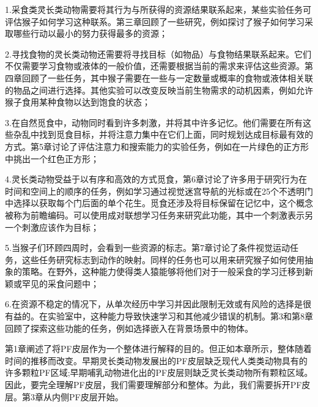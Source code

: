 1.采食类灵长类动物需要将其行为与所获得的资源结果联系起来，某些实验任务可评估猴子如何学习这种联系。第三章回顾了一些研究，例如探讨了猴子如何学习采取哪些行动以最小的努力获得最多的资源；\par
2.寻找食物的灵长类动物还需要将寻找目标（如物品）与食物结果联系起来。它们不仅需要学习食物或液体的一般价值，还需要根据当前的需求来评估这些资源。第四章回顾了一些任务，其中猴子需要在一些与一定数量或概率的食物或液体相关联的物品之间进行选择。其他实验可以改变反映当前生物需求的动机因素，例如允许猴子食用某种食物以达到饱食的状态；\par
3.在自然觅食中，动物同时看到许多刺激，并将其中许多记忆。他们需要在所有这些杂乱中找到觅食目标，并将注意力集中在它们上面，同时规划达成目标最有效的方式。第5章讨论了评估注意力和搜索能力的实验任务，例如在一片绿色的正方形中挑出一个红色正方形；\par
4.灵长类动物受益于以有序和高效的方式觅食，第6章讨论了许多用于研究行为在时间和空间上的顺序的任务，例如学习通过视觉迷宫导航的光标或在25个不透明门中选择以获取每个门后面的单个花生。觅食还涉及将目标保留在记忆中，这个概念被称为前瞻编码。可以使用成对联想学习任务来研究此功能，其中一个刺激表示另一个刺激应该作为目标；\par
5.当猴子们环顾四周时，会看到一些资源的标志。第7章讨论了条件视觉运动任务，这些任务研究标志到动作的映射。同样的任务也可以用来研究猴子如何使用抽象的策略。在野外，这种能力使得类人猿能够将他们对于一般采食的学习迁移到新颖或罕见的采食问题中；\par
6.在资源不稳定的情况下，从单次经历中学习并因此限制无效或有风险的选择是很有益的。在实验室中，这种能力导致快速学习和其他减少错误的机制。第3和第8章回顾了探索这些功能的任务，例如选择嵌入在背景场景中的物体。

第1章阐述了将PF皮层作为一个整体进行解释的目的。但正如本章所示，整体随着时间的推移而改变。早期灵长类动物发展出的PF皮层缺乏现代人类类动物具有的许多颗粒PF区域;早期哺乳动物进化出的PF皮层则缺乏灵长类动物所有颗粒区域。因此，要完全理解PF皮层，我们需要理解部分和整体。为此，我们需要拆开PF皮层。第3章从内侧PF皮层开始。